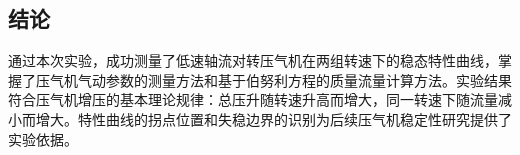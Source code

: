 \subsection{结论}

通过本次实验，成功测量了低速轴流对转压气机在两组转速下的稳态特性曲线，掌握了压气机气动参数的测量方法和基于伯努利方程的质量流量计算方法。实验结果符合压气机增压的基本理论规律：总压升随转速升高而增大，同一转速下随流量减小而增大。特性曲线的拐点位置和失稳边界的识别为后续压气机稳定性研究提供了实验依据。
